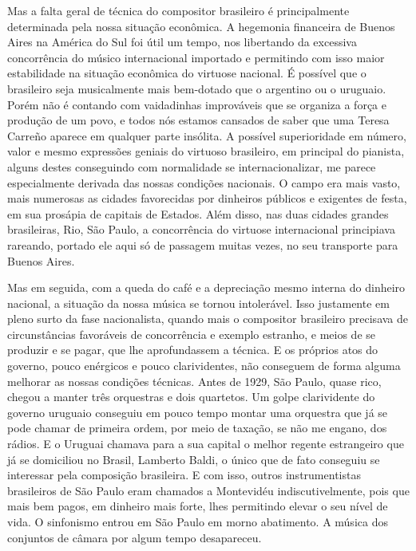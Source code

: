 Mas a falta geral de técnica do compositor brasileiro é principalmente
determinada pela nossa situação econômica. A hegemonia financeira de
Buenos Aires na América do Sul foi útil um tempo, nos libertando da
excessiva concorrência do músico internacional importado e permitindo
com isso maior estabilidade na situação econômica do virtuose nacional.
É possível que o brasileiro seja musicalmente mais bem-dotado que o
argentino ou o uruguaio. Porém não é contando com vaidadinhas
improváveis que se organiza a força e produção de um povo, e todos nós
estamos cansados de saber que uma Teresa Carreño aparece em qualquer
parte insólita. A possível superioridade em número, valor e mesmo
expressões geniais do virtuoso brasileiro, em principal do pianista,
alguns destes conseguindo com normalidade se internacionalizar, me
parece especialmente derivada das nossas condições nacionais. O campo
era mais vasto, mais numerosas as cidades favorecidas por dinheiros
públicos e exigentes de festa, em sua prosápia de capitais de Estados.
Além disso, nas duas cidades grandes brasileiras, Rio, São Paulo, a
concorrência do virtuose internacional principiava rareando, portado ele
aqui só de passagem muitas vezes, no seu transporte para Buenos Aires.

Mas em seguida, com a queda do café e a depreciação mesmo interna do
dinheiro nacional, a situação da nossa música se tornou intolerável.
Isso justamente em pleno surto da fase nacionalista, quando mais o
compositor brasileiro precisava de circunstâncias favoráveis de
concorrência e exemplo estranho, e meios de se produzir e se pagar, que
lhe aprofundassem a técnica. E os próprios atos do governo, pouco
enérgicos e pouco clarividentes, não conseguem de forma alguma melhorar
as nossas condições técnicas. Antes de 1929, São Paulo, quase rico,
chegou a manter três orquestras e dois quartetos. Um golpe clarividente
do governo uruguaio conseguiu em pouco tempo montar uma orquestra que já
se pode chamar de primeira ordem, por meio de taxação, se não me engano,
dos rádios. E o Uruguai chamava para a sua capital o melhor regente
estrangeiro que já se domiciliou no Brasil, Lamberto Baldi, o único que
de fato conseguiu se interessar pela composição brasileira. E com isso,
outros instrumentistas brasileiros de São Paulo eram chamados a
Montevidéu indiscutivelmente, pois que mais bem pagos, em dinheiro mais
forte, lhes permitindo elevar o seu nível de vida. O sinfonismo entrou
em São Paulo em morno abatimento. A música dos conjuntos de câmara por
algum tempo desapareceu.

